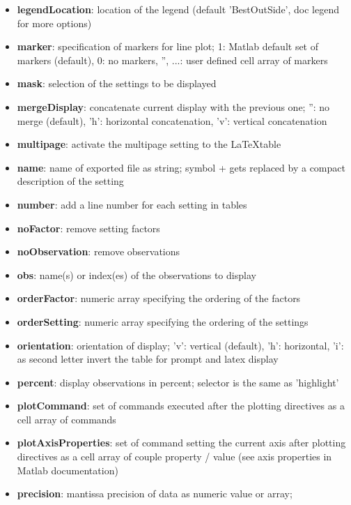\documentclass[a4paper,fleqn]{tufte-handout}
\begin{document}
\begin{itemize}
\item \textbf{legendLocation}: location of the legend (default 'BestOutSide', doc legend for more options)                 
\item \textbf{marker}:  specification of markers for line plot;
           1: Matlab default set of markers (default),
           0: no markers,
           {'', ...}: user defined cell array of markers 
\item \textbf{mask}:    selection of the settings to be displayed              
\item \textbf{mergeDisplay}: concatenate current display with the previous one;
        '': no merge (default),
        'h': horizontal concatenation,
        'v': vertical concatenation                 
\item \textbf{multipage}:   activate the multipage setting to the \LaTeX table 
\item \textbf{name}:   name of exported file as string; 
    	symbol + gets replaced by a compact description of the setting              
\item \textbf{number}:  add a line number for each setting in tables                
\item \textbf{noFactor}:  remove setting factors 
\item \textbf{noObservation}: remove observations                 
\item \textbf{obs}: name(s) or index(es) of the observations to display                 
\item \textbf{orderFactor}:   numeric array specifying the ordering of the factors
\item \textbf{orderSetting}:    numeric array specifying the ordering of the settings              
\item \textbf{orientation}:  orientation of display;
    	'v': vertical (default),
    	'h': horizontal,
       'i': as second letter invert the table for prompt and latex
           display                
\item \textbf{percent}: display observations in percent;
    	selector is the same as 'highlight'  
\item \textbf{plotCommand}:  set of commands executed after the plotting
       directives as a cell array of commands                  
\item \textbf{plotAxisProperties}: set of command setting the current axis after plotting
       directives as a cell array of couple property / value (see axis properties in Matlab documentation)  
\item \textbf{precision}:  mantissa precision of data as numeric value or array;

\end{itemize}
\end{document}
